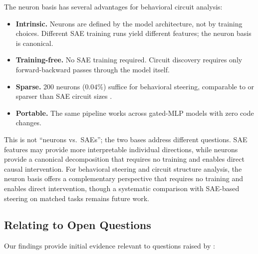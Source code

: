 \documentclass[11pt]{article}
\begin{document}
The neuron basis has several advantages for behavioral circuit analysis:
\begin{itemize}[leftmargin=2em]
    \item \textbf{Intrinsic.} Neurons are defined by the model architecture, not by training choices. Different SAE training runs yield different features; the neuron basis is canonical.
    \item \textbf{Training-free.} No SAE training required. Circuit discovery requires only forward-backward passes through the model itself.
    \item \textbf{Sparse.} 200 neurons ($0.04\%$) suffice for behavioral steering, comparable to or sparser than SAE circuit sizes \citep{marks2024sparse}.
    \item \textbf{Portable.} The same pipeline works across gated-MLP models with zero code changes.
\end{itemize}

This is not ``neurons vs.\ SAEs''; the two bases address different questions.
SAE features may provide more interpretable individual directions, while neurons provide a canonical decomposition that requires no training and enables direct causal intervention.
For behavioral steering and circuit structure analysis, the neuron basis offers a complementary perspective that requires no training and enables direct intervention, though a systematic comparison with SAE-based steering on matched tasks remains future work.

\subsection{Relating to Open Questions}

Our findings provide initial evidence relevant to questions raised by \citet{chalnick2025goodfire}:
\end{document}
